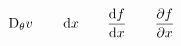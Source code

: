 \documentclass{article}
\begin{document}
\[ \mdif{\theta} v \qquad \odif{x} \qquad \odv{f}{x} \qquad \pdv{f}{x} \]
\end{document}
